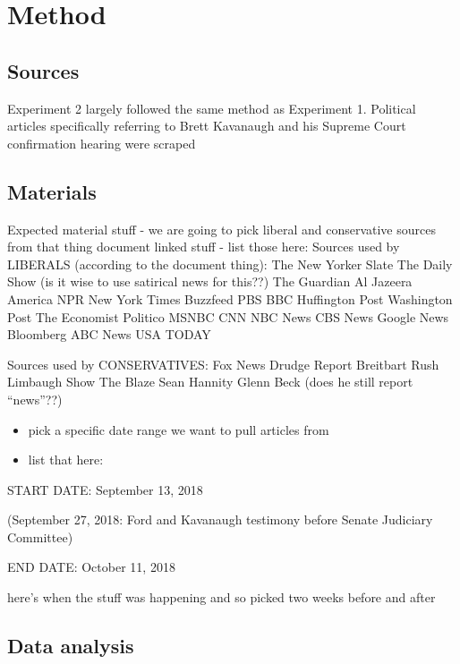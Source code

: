 \documentclass[,man]{apa6}
\providecommand{\tightlist}{%
  \setlength{\itemsep}{0pt}\setlength{\parskip}{0pt}}
\theoremstyle{definition}
\theoremstyle{definition}
\theoremstyle{definition}
\theoremstyle{remark}
\begin{document}
\hypertarget{method-1}{%
\section{Method}\label{method-1}}

\hypertarget{sources-1}{%
\subsection{Sources}\label{sources-1}}

Experiment 2 largely followed the same method as Experiment 1. Political
articles specifically referring to Brett Kavanaugh and his Supreme Court
confirmation hearing were scraped

\hypertarget{materials-1}{%
\subsection{Materials}\label{materials-1}}

Expected material stuff - we are going to pick liberal and conservative
sources from that thing document linked stuff - list those here: Sources
used by LIBERALS (according to the document thing): The New Yorker Slate
The Daily Show (is it wise to use satirical news for this??) The
Guardian Al Jazeera America NPR New York Times Buzzfeed PBS BBC
Huffington Post Washington Post The Economist Politico MSNBC CNN NBC
News CBS News Google News Bloomberg ABC News USA TODAY

Sources used by CONSERVATIVES: Fox News Drudge Report Breitbart Rush
Limbaugh Show The Blaze Sean Hannity Glenn Beck (does he still report
\enquote{news}??)

\begin{itemize}
\tightlist
\item
  pick a specific date range we want to pull articles from
\item
  list that here:
\end{itemize}

START DATE: September 13, 2018

(September 27, 2018: Ford and Kavanaugh testimony before Senate
Judiciary Committee)

END DATE: October 11, 2018

here's when the stuff was happening and so picked two weeks before and
after

\hypertarget{data-analysis-1}{%
\subsection{Data analysis}\label{data-analysis-1}}
\end{document}
